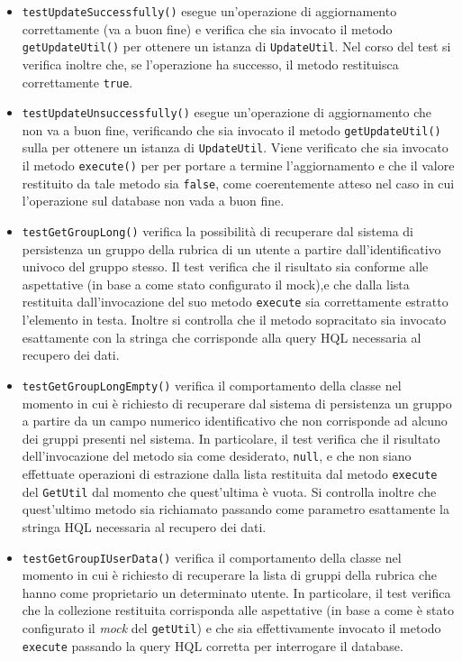 \begin{itemize}
\begin{itemize}
\item \texttt{testUpdateSuccessfully()} esegue un'operazione di aggiornamento correttamente (va a buon fine) e verifica che sia invocato il metodo \texttt{getUpdateUtil()} per ottenere un istanza di \texttt{UpdateUtil}. Nel corso del test si verifica inoltre che, se l'operazione ha successo, il metodo restituisca correttamente \texttt{true}.

\item \texttt{testUpdateUnsuccessfully()} esegue un'operazione di aggiornamento che non va a buon fine, verificando che sia invocato il metodo \texttt{getUpdateUtil()} sulla  per ottenere un istanza di \texttt{UpdateUtil}. Viene verificato che sia invocato il metodo \texttt{execute()} per per portare a termine l'aggiornamento e che il valore restituito da tale metodo sia \texttt{false}, come coerentemente atteso nel caso in cui l'operazione sul database non vada a buon fine.

\item \texttt{testGetGroupLong()} verifica la possibilità di recuperare dal sistema di persistenza un gruppo della rubrica di un utente a partire dall'identificativo univoco del gruppo stesso. Il test verifica che il risultato sia conforme alle aspettative (in base a come stato configurato il mock),e che dalla lista restituita dall'invocazione del suo metodo \texttt{execute} sia correttamente estratto l'elemento in testa. Inoltre si controlla che il metodo sopracitato sia invocato esattamente con la stringa che corrisponde alla query HQL necessaria al recupero dei dati. 

\item \texttt{testGetGroupLongEmpty()} verifica il comportamento della classe nel momento in cui è richiesto di recuperare dal sistema di persistenza un gruppo a partire da un campo numerico identificativo che non corrisponde ad alcuno dei gruppi presenti nel sistema. In particolare, il test verifica che il risultato dell'invocazione del metodo sia come desiderato, \texttt{null}, e che non siano effettuate operazioni di estrazione dalla lista restituita dal metodo \texttt{execute} del \texttt{GetUtil} dal momento che quest'ultima è vuota. Si controlla inoltre che quest'ultimo metodo sia richiamato passando come parametro esattamente la stringa HQL necessaria al recupero dei dati.

\item \texttt{testGetGroupIUserData()} verifica il comportamento della classe nel momento in cui è richiesto di recuperare la lista di gruppi della rubrica che hanno come proprietario un determinato utente. In particolare, il test verifica che la collezione restituita corrisponda alle aspettative (in base a come è stato configurato il \textit{mock} del \texttt{getUtil}) e che sia effettivamente invocato il metodo \texttt{execute} passando la query HQL corretta per interrogare il database.


\end{itemize}
\end{itemize}
